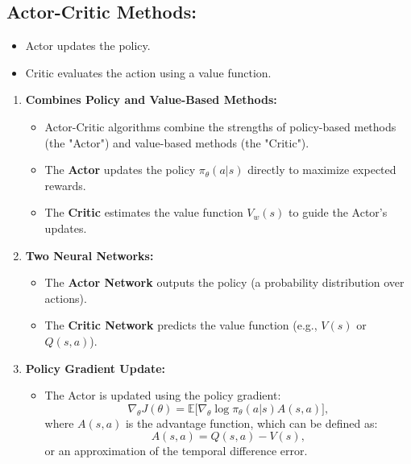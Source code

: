 \documentclass[12pt,a4paper]{article}
\begin{document}
\subsection{Actor-Critic Methods:} 
    \begin{itemize}
        \item Actor updates the policy.
        \item Critic evaluates the action using a value function.
    \end{itemize}
    \begin{enumerate}
    \item \textbf{Combines Policy and Value-Based Methods:}
    \begin{itemize}
        \item Actor-Critic algorithms combine the strengths of policy-based methods (the "Actor") and value-based methods (the "Critic").
        \item The \textbf{Actor} updates the policy \( \pi_\theta(a|s) \) directly to maximize expected rewards.
        \item The \textbf{Critic} estimates the value function \( V_w(s) \) to guide the Actor's updates.
    \end{itemize}

    \item \textbf{Two Neural Networks:}
    \begin{itemize}
        \item The \textbf{Actor Network} outputs the policy (a probability distribution over actions).
        \item The \textbf{Critic Network} predicts the value function (e.g., \( V(s) \) or \( Q(s, a) \)).
    \end{itemize}

    \item \textbf{Policy Gradient Update:}
    \begin{itemize}
        \item The Actor is updated using the policy gradient:
        \[
        \nabla_\theta J(\theta) = \mathbb{E} \big[ \nabla_\theta \log \pi_\theta(a|s) A(s, a) \big],
        \]
        where \( A(s, a) \) is the advantage function, which can be defined as:
        \[
        A(s, a) = Q(s, a) - V(s),
        \]
        or an approximation of the temporal difference error.
    \end{itemize}
\end{enumerate}
\end{document}
